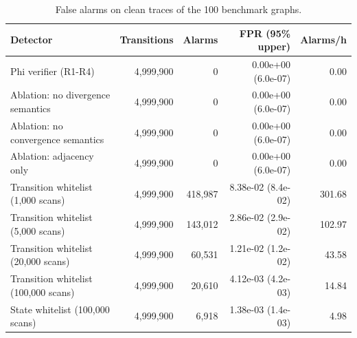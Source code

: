 \begin{table}[t]
\centering
\caption{False alarms on clean traces of the 100 benchmark graphs.}
\label{tab:false-alarms}
\small
\begin{tabular}{lrrrr}
\toprule
Detector & Transitions & Alarms & FPR (95\% upper) & Alarms/h \\
\midrule
Phi verifier (R1-R4) & 4,999,900 & 0 & 0.00e+00 (6.0e-07) & 0.00 \\
Ablation: no divergence semantics & 4,999,900 & 0 & 0.00e+00 (6.0e-07) & 0.00 \\
Ablation: no convergence semantics & 4,999,900 & 0 & 0.00e+00 (6.0e-07) & 0.00 \\
Ablation: adjacency only & 4,999,900 & 0 & 0.00e+00 (6.0e-07) & 0.00 \\
Transition whitelist (1,000 scans) & 4,999,900 & 418,987 & 8.38e-02 (8.4e-02) & 301.68 \\
Transition whitelist (5,000 scans) & 4,999,900 & 143,012 & 2.86e-02 (2.9e-02) & 102.97 \\
Transition whitelist (20,000 scans) & 4,999,900 & 60,531 & 1.21e-02 (1.2e-02) & 43.58 \\
Transition whitelist (100,000 scans) & 4,999,900 & 20,610 & 4.12e-03 (4.2e-03) & 14.84 \\
State whitelist (100,000 scans) & 4,999,900 & 6,918 & 1.38e-03 (1.4e-03) & 4.98 \\
\bottomrule
\end{tabular}
\end{table}
